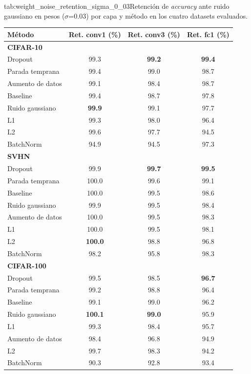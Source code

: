 \begin{table}{tab:weight_noise_retention_sigma_0_03}{Retención de \textit{accuracy} ante ruido gaussiano en pesos ($\sigma$=0.03) por capa y método en los cuatro datasets evaluados.}
\small
\begin{tabular}{lccc}
\toprule
\textbf{Método} & \textbf{Ret. conv1 (\%)} & \textbf{Ret. conv3 (\%)} & \textbf{Ret. fc1 (\%)} \\
\midrule
\multicolumn{4}{l}{\textbf{CIFAR-10}}\\
\midrule
Dropout & 99.3 & \textbf{99.2} & \textbf{99.4} \\
Parada temprana & 99.4 & 99.0 & 98.7 \\
Aumento de datos & 99.1 & 98.4 & 98.7 \\
Baseline & 99.4 & 98.7 & 97.8 \\
Ruido gaussiano & \textbf{99.9} & 99.1 & 97.7 \\
L1 & 99.3 & 98.0 & 96.4 \\
L2 & 99.6 & 97.7 & 94.5 \\
BatchNorm & 94.9 & 94.5 & 97.3 \\
\midrule
\multicolumn{4}{l}{\textbf{SVHN}}\\
\midrule
Dropout & 99.9 & \textbf{99.7} & \textbf{99.5} \\
Parada temprana & 100.0 & 99.6 & 99.1 \\
Baseline & 100.0 & 99.5 & 98.6 \\
Ruido gaussiano & 99.9 & 99.5 & 98.4 \\
Aumento de datos & 100.0 & 99.5 & 98.3 \\
L1 & 100.0 & 99.5 & 98.1 \\
L2 & \textbf{100.0} & 98.8 & 96.8 \\
BatchNorm & 98.2 & 95.8 & 98.3 \\
\midrule
\multicolumn{4}{l}{\textbf{CIFAR-100}}\\
\midrule
Dropout & 99.5 & 98.5 & \textbf{96.7} \\
Parada temprana & 99.2 & 98.8 & 96.4 \\
Baseline & 99.1 & 99.0 & 96.2 \\
Ruido gaussiano & \textbf{100.1} & \textbf{99.0} & 95.9 \\
L1 & 99.3 & 98.4 & 95.7 \\
Aumento de datos & 98.4 & 96.8 & 94.9 \\
L2 & 99.7 & 98.3 & 94.2 \\
BatchNorm & 90.3 & 92.8 & 93.4 \\
\midrule

\end{tabular}
\end{table}
